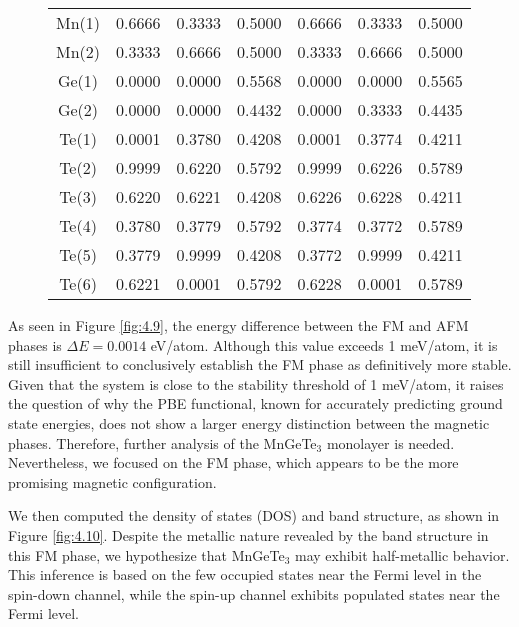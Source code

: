 \begin{figure}[H]
\begin{minipage}[b]{.55\linewidth}
{\begin{tabular}{ccccccc}
				Mn(1) & 0.6666 & 0.3333 & 0.5000  & 0.6666 & 0.3333  & 0.5000 \\
				Mn(2) & 0.3333 & 0.6666 & 0.5000  & 0.3333 & 0.6666  & 0.5000 \\
				Ge(1) & 0.0000 & 0.0000 & 0.5568  & 0.0000 & 0.0000  & 0.5565 \\
				Ge(2) & 0.0000 & 0.0000 & 0.4432  & 0.0000 & 0.3333  & 0.4435 \\
				Te(1) & 0.0001 & 0.3780 & 0.4208  & 0.0001 & 0.3774  & 0.4211 \\
				Te(2) & 0.9999 & 0.6220 & 0.5792  & 0.9999 & 0.6226  & 0.5789 \\
				Te(3) & 0.6220 & 0.6221 & 0.4208  & 0.6226 & 0.6228  & 0.4211 \\
				Te(4) & 0.3780 & 0.3779 & 0.5792  & 0.3774 & 0.3772  & 0.5789 \\
				Te(5) & 0.3779 & 0.9999 & 0.4208  & 0.3772 & 0.9999  & 0.4211 \\
				Te(6) & 0.6221 & 0.0001 & 0.5792  & 0.6228 & 0.0001  & 0.5789 \\
				\bottomrule
				\bottomrule
			\end{tabular}
		}
	\end{minipage}
\end{figure}

As seen in Figure \ref{fig:4.9}, the energy difference between the FM and AFM phases is $\Delta E = 0.0014$ eV/atom. Although this value exceeds 1 meV/atom, it is still insufficient to conclusively establish the FM phase as definitively more stable. Given that the system is close to the stability threshold of 1 meV/atom, it raises the question of why the PBE functional, known for accurately predicting ground state energies, does not show a larger energy distinction between the magnetic phases. Therefore, further analysis of the MnGeTe$_3$ monolayer is needed. Nevertheless, we focused on the FM phase, which appears to be the more promising magnetic configuration.

We then computed the density of states (DOS) and band structure, as shown in Figure \ref{fig:4.10}. Despite the metallic nature revealed by the band structure in this FM phase, we hypothesize that MnGeTe$_3$ may exhibit half-metallic behavior. This inference is based on the few occupied states near the Fermi level in the spin-down channel, while the spin-up channel exhibits populated states near the Fermi level.

